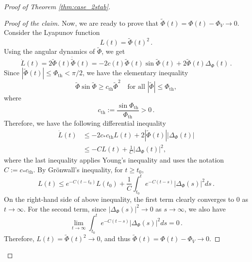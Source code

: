\documentclass[10pt]{article}
\theoremstyle{definition}
\theoremstyle{definition}
\numberwithin{equation}{section}
\newcommand{\DeltaPhi}{\Delta_{\Phi}}
\newcommand{\PhiV}{\Phi_{V}}
\newcommand{\WPhi}{\widetilde{\Phi}}
\newcommand{\PhiTH}{\Phi_{\mathrm{th}}}
\begin{document}
\begin{proof}[Proof of Theorem \ref{thm:case_2stab}]
\begin{proof}[Proof of the claim]
Now, we are ready to prove that $\WPhi(t) = \Phi(t) - \PhiV \rightarrow 0$.
Consider the Lyapunov function
\begin{equation*}
    L(t) = \WPhi(t)^2 \, .
\end{equation*}
Using the angular dynamics of $\WPhi$, we get
\begin{equation*}
\Dot{L}(t) = 2 \WPhi(t) \Dot{\WPhi} (t) = -2c(t) \WPhi(t) \sin \WPhi(t) + 2 \WPhi(t) \DeltaPhi (t) \, .
\end{equation*}
Since $|\WPhi(t)| \leq \PhiTH < \pi/2$, we have the elementary inequality
\begin{equation*}
\WPhi \sin \WPhi \geq c_{\mathrm{th}} \WPhi^2 \quad \text{for all } |\WPhi| \leq \PhiTH,
\end{equation*}
where
\begin{equation*}
    c_{\mathrm{th}} := \frac{\sin \PhiTH}{\PhiTH} > 0 \, .
\end{equation*}
Therefore, we have the following differential inequality
\begin{equation*}
\begin{aligned}
\Dot{L}(t) &\leq -2 c_* c_{\mathrm{th}} L(t) + 2 |\WPhi(t)| |\DeltaPhi(t)| \\
&\leq - C L(t) + \frac{1}{C} |\DeltaPhi(t)|^2,
\end{aligned}
\end{equation*}
where the last inequality applies Young's inequality and uses the notation $C := c_* c_{\mathrm{th}}$.
By Grönwall's inequality, for $t \geq t_0$, 
\begin{equation*}
L(t) \leq e^{-C(t-t_0)} L(t_0) + \frac{1}{C} \int_{t_0}^t e^{-C(t-s)} |\DeltaPhi (s)|^2 ds \, .
\end{equation*}
On the right-hand side of above inequality, the first term clearly converges to $0$ as $t \rightarrow \infty$.
For the second term, since $|\DeltaPhi(s)|^2 \rightarrow 0$ as $s \rightarrow \infty$, we also have
\begin{equation*}
    \lim_{t \rightarrow \infty} \int_{t_0}^t e^{-C(t-s)} |\DeltaPhi (s)|^2 ds = 0 \, .
\end{equation*}
Therefore, $L(t) = \WPhi(t)^2 \rightarrow 0$, and thus $\WPhi(t) = \Phi(t) - \PhiV \rightarrow 0$.
\end{proof}


\end{proof}
\end{document}
